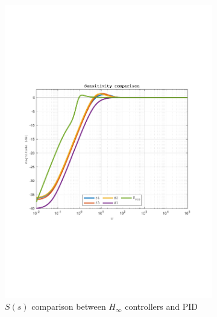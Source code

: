 \documentclass[a4paper, 12pt]{article}
\begin{document}
\begin{figure}[h!]
 \begin{subfigure}[t]{0.32\textwidth}
    \includegraphics[width=\textwidth]
    {Figures/fig03a.pdf}
    \captionsetup{margin=2mm}
    \caption{$S(s)$ comparison between $H_\infty$ controllers and PID}
    \label{fig:fig03a}
    \end{subfigure}
    \begin{subfigure}[t]{0.32\textwidth}

\end{subfigure}
\end{figure}
\end{document}
